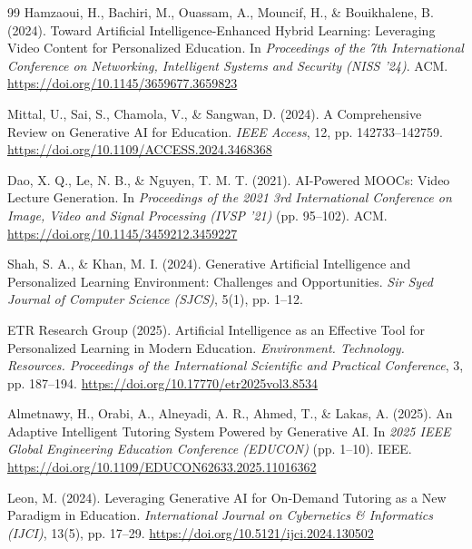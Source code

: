 \begin{thebibliography}{99}
Hamzaoui, H., Bachiri, M., Ouassam, A., Mouncif, H., \& Bouikhalene, B. (2024). Toward Artificial Intelligence-Enhanced Hybrid Learning: Leveraging Video Content for Personalized Education. In \textit{Proceedings of the 7th International Conference on Networking, Intelligent Systems and Security (NISS '24)}. ACM. \url{https://doi.org/10.1145/3659677.3659823}

Mittal, U., Sai, S., Chamola, V., \& Sangwan, D. (2024). A Comprehensive Review on Generative AI for Education. \textit{IEEE Access}, 12, pp. 142733--142759. \url{https://doi.org/10.1109/ACCESS.2024.3468368}

Dao, X. Q., Le, N. B., \& Nguyen, T. M. T. (2021). AI-Powered MOOCs: Video Lecture Generation. In \textit{Proceedings of the 2021 3rd International Conference on Image, Video and Signal Processing (IVSP '21)} (pp. 95--102). ACM. \url{https://doi.org/10.1145/3459212.3459227}

Shah, S. A., \& Khan, M. I. (2024). Generative Artificial Intelligence and Personalized Learning Environment: Challenges and Opportunities. \textit{Sir Syed Journal of Computer Science (SJCS)}, 5(1), pp. 1--12.

ETR Research Group (2025). Artificial Intelligence as an Effective Tool for Personalized Learning in Modern Education. \textit{Environment. Technology. Resources. Proceedings of the International Scientific and Practical Conference}, 3, pp. 187--194. \url{https://doi.org/10.17770/etr2025vol3.8534}

Almetnawy, H., Orabi, A., Alneyadi, A. R., Ahmed, T., \& Lakas, A. (2025). An Adaptive Intelligent Tutoring System Powered by Generative AI. In \textit{2025 IEEE Global Engineering Education Conference (EDUCON)} (pp. 1--10). IEEE. \url{https://doi.org/10.1109/EDUCON62633.2025.11016362}

Leon, M. (2024). Leveraging Generative AI for On-Demand Tutoring as a New Paradigm in Education. \textit{International Journal on Cybernetics \& Informatics (IJCI)}, 13(5), pp. 17--29. \url{https://doi.org/10.5121/ijci.2024.130502}

\end{thebibliography}
